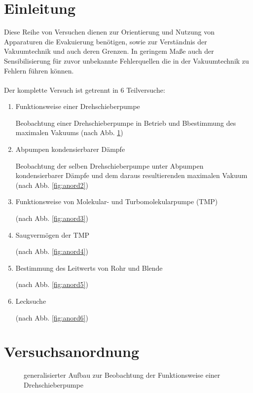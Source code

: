 \documentclass[12pt, a4paper]{scrartcl}
\begin{document}
	\section{Einleitung}
		Diese Reihe von Versuchen dienen zur Orientierung und Nutzung von Apparaturen die Evakuierung benötigen, sowie zur Verständnis der Vakuumtechnik und auch deren Grenzen. In geringem Maße auch der Sensibilisierung für zuvor unbekannte Fehlerquellen die in der Vakuumtechnik zu Fehlern führen können.\\\\
		Der komplette Versuch ist getrennt in 6 Teilversuche: \cite{skript}
		\begin{enumerate}
			\item Funktionsweise einer Drehschieberpumpe
			
				Beobachtung einer Drehschieberpumpe in Betrieb und Bbestimmung des maximalen Vakuums (nach Abb. \ref{fig:anord1})

			\item Abpumpen kondensierbarer Dämpfe
				
				Beobachtung der selben Drehschieberpumpe unter Abpumpen kondensierbarer Dämpfe und dem daraus resultierenden maximalen Vakuum (nach Abb. \ref{fig:anord2})

			\item Funktionsweise von Molekular- und Turbomolekularpumpe (TMP)
                
                (nach Abb. \ref{fig:anord3})
			
			\item Saugvermögen der TMP
            
                (nach Abb. \ref{fig:anord4})
			
			\item Bestimmung des Leitwerts von Rohr und Blende
            
                (nach Abb. \ref{fig:anord5})
			
			\item Lecksuche
            
                (nach Abb. \ref{fig:anord6})
		\end{enumerate}
	
	\section{Versuchsanordnung}
        \begin{figure}[H]
            \centering
            \caption{generalisierter Aufbau zur Beobachtung der Funktionsweise einer Drehschieberpumpe}
            \label{fig:anord1}
        \end{figure}
    
\end{document}
